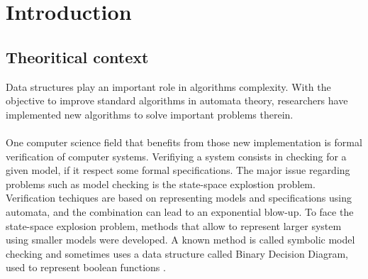 \documentclass[11pt,a4paper]{article}
\theoremstyle{definition}
\begin{document}
%



\newpage

\tableofcontents

\newpage


\newpage

\section{Introduction}

\subsection{Theoritical context}

Data structures play an important role in algorithms complexity.
With the objective to improve standard algorithms in automata theory,
researchers
have implemented new algorithms to solve
important problems therein.

\paragraph{}

One computer science
field that benefits from
those new implementation is formal verification of computer systems.
Verifiying a system consists in checking for a given model, if
it respect some formal specifications.
The major issue regarding problems
such as model checking is the state-space explostion problem.
Verification techiques are based on representing
models and specifications using automata, and the combination
can lead to an exponential blow-up. To face the state-space explosion
problem, methods that allow to represent larger system using
smaller models were developed. A known method is called
symbolic model checking and sometimes uses a data structure called
Binary Decision Diagram, used to represent boolean functions
\cite{baier_principles_2008}.


\paragraph{}
\end{document}
